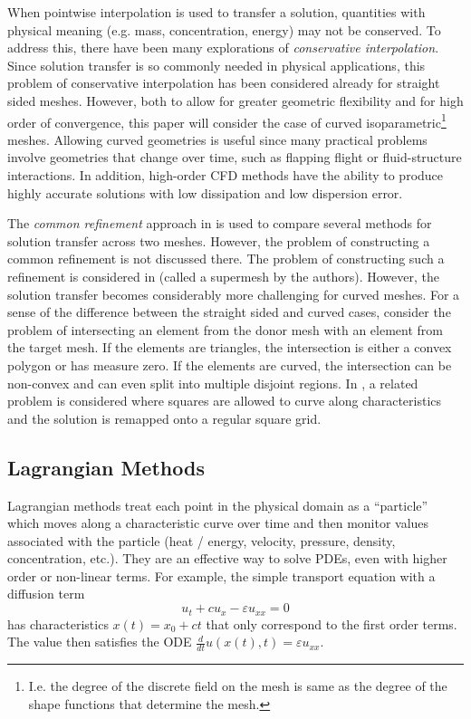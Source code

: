 \documentclass[letterpaper,10pt]{article}
\theoremstyle{definition}
\newcommand{\eps}{\varepsilon}
\begin{document}
When pointwise interpolation is used to transfer a solution, quantities with
physical meaning (e.g. mass, concentration, energy) may not be conserved.
To address this, there have been many explorations of
\emph{conservative interpolation}. Since solution transfer is so commonly
needed in physical applications, this problem of conservative interpolation
has been considered already for straight sided meshes.
However, both to allow for greater
geometric flexibility and for high order of convergence, this paper will
consider the case of curved isoparametric\footnote{I.e. the degree of the
discrete field on the mesh is same as the degree of the shape functions that
determine the mesh.} meshes. Allowing curved geometries is useful since
many practical
problems involve geometries that change over time, such as flapping flight
or fluid-structure interactions. In addition, high-order CFD methods
have the ability to produce highly accurate solutions
with low dissipation and low dispersion error.

The \emph{common refinement} approach in
\cite{Jiao2004} is used to compare several methods for solution transfer across
two meshes. However, the problem of constructing a common refinement is
not discussed there. The problem of constructing such a refinement is
considered in \cite{Farrell2009, Farrell2011} (called a supermesh by
the authors).
However, the solution transfer becomes considerably more challenging for curved
meshes. For a sense of the difference between the straight sided and curved
cases, consider the problem of intersecting an element from the donor mesh
with an element from the target mesh. If the elements are triangles, the
intersection is either a convex polygon or has measure zero. If the elements
are curved, the intersection can be non-convex and can even split into
multiple disjoint regions. In \cite{Qiu2018}, a related problem is considered
where squares are allowed to curve along characteristics and the solution is
remapped onto a regular square grid.

\subsection{Lagrangian Methods}

Lagrangian methods treat each point in the
physical domain as a ``particle'' which moves along a characteristic curve
over time and then monitor values associated with the particle (heat / energy,
velocity, pressure, density, concentration, etc.). They are an effective way
to solve PDEs, even with higher order or non-linear terms.
For example, the simple transport equation with a diffusion term
\begin{equation}
u_t + c u_x - \eps u_{xx} = 0
\end{equation}
has characteristics \(x(t) = x_0 + ct\) that only correspond to the
first order terms. The value then satisfies the
ODE \(\frac{d}{dt} u(x(t), t) = \eps u_{xx}\).
\end{document}

